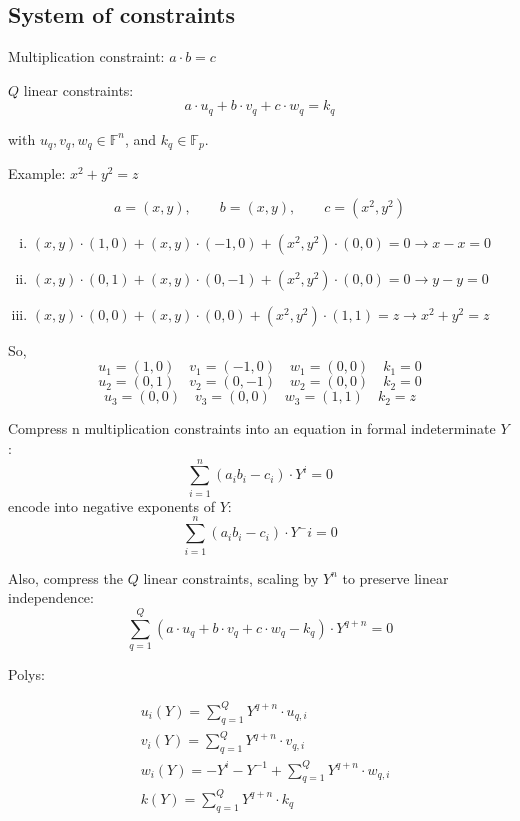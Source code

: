 \documentclass{article}
\theoremstyle{definition}
\begin{document}
\subsection{System of constraints}
Multiplication constraint: $a \cdot b = c$

$Q$ linear constraints:
$$
a \cdot u_q + b \cdot v_q + c \cdot w_q = k_q
$$

with $u_q, v_q, w_q \in \mathbb{F}^n$, and $k_q \in \mathbb{F}_p$.

\vspace{0.5cm}
Example: $x^2 + y^2 = z$

$$a = (x, y), \qquad b = (x, y), \qquad c = (x^2, y^2)$$
\begin{enumerate}[i.]
    \item $(x, y) \cdot (1, 0) + (x, y) \cdot (-1, 0) + (x^2, y^2) \cdot (0, 0) = 0 \longrightarrow x - x = 0$
    \item $(x, y) \cdot (0, 1) + (x, y) \cdot (0, -1) + (x^2, y^2) \cdot (0, 0) = 0 \longrightarrow y - y = 0$
    \item $(x, y) \cdot (0, 0) + (x, y) \cdot (0, 0) + (x^2, y^2) \cdot (1, 1) = z \longrightarrow x^2 + y^2 = z$
\end{enumerate}

So,
$$u_1 = (1, 0) \quad v_1=(-1, 0) \quad w_1=(0, 0) \quad k_1=0$$
$$u_2 = (0, 1) \quad v_2=(0, -1) \quad w_2=(0, 0) \quad k_2=0$$
$$u_3 = (0, 0) \quad v_3=(0, 0) \quad w_3=(1, 1) \quad k_2=z$$

\vspace{1cm}

Compress n multiplication constraints into an equation in formal indeterminate $Y$:
$$\sum_{i=1}^n (a_i b_i - c_i) \cdot Y^i = 0$$
encode into negative exponents of $Y$:
$$\sum_{i=1}^n (a_i b_i - c_i) \cdot Y^-i = 0$$

Also, compress the $Q$ linear constraints, scaling by $Y^n$ to preserve linear independence:
$$
\sum_{q=1}^Q (a \cdot u_q + b \cdot v_q + c \cdot w_q - k_q) \cdot Y^{q+n} = 0
$$

Polys:

\begin{align}
\nonumber & u_i(Y) = \sum_{q=1}^Q Y^{q+n} \cdot u_{q, i}\\
\nonumber & v_i(Y) = \sum_{q=1}^Q Y^{q+n} \cdot v_{q, i}\\
\nonumber & w_i(Y) = -Y^i - Y^{-1} + \sum_{q=1}^Q Y^{q+n} \cdot w_{q, i}\\
\nonumber & k(Y) = \sum_{q=1}^Q Y^{q+n} \cdot k_q
\end{align}
\end{document}

